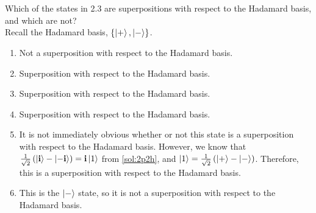 \section{}

Which of the states in 2.3 are superpositions with respect to the Hadamard basis, and which are not? \\

{\Sol}
Recall the Hadamard basis, $\{ \ket{+}, \ket{-} \}$.

\begin{enumerate}[label=\alph*.,ref={Sol.~\thesection\alph*}]
\label{sol:2p4}
    \item Not a superposition with respect to the Hadamard basis.
    \item Superposition with respect to the Hadamard basis.
    \item Superposition with respect to the Hadamard basis.
    \item Superposition with respect to the Hadamard basis.
    \item \label{sol:2p2e} It is not immediately obvious whether or not this state is a superposition with respect to the Hadamard basis.
    However, we know that $\tfrac{1}{\sqrt{2}} \left ( \ket{\mathbf{i}} - \ket{-\mathbf{i}} \right ) = \mathbf{i} \ket{1}$ from \ref{sol:2p2h}, and
    $\ket{1} = \tfrac{1}{\sqrt{2}} \left ( \ket{+} - \ket{-} \right )$.
    Therefore, this is a superposition with respect to the Hadamard basis.
    \item This is the $\ket{-}$ state, so it is not a superposition with respect to the Hadamard basis.
\end{enumerate}
